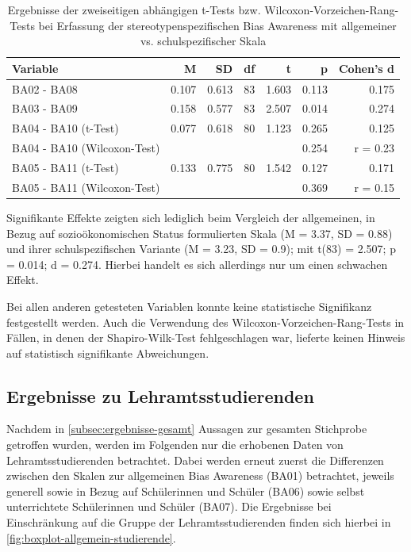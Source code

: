 \begin{table}[h!]
	\begin{tabularx}{\textwidth}{X | r | r | r | r | r | r}
		\hline
		Variable & M & SD & df & t & p & Cohen's d\\
		\hline
		BA02 - BA08 & 0.107 & 0.613 & 83 & 1.603 & 0.113 & 0.175\\
		BA03 - BA09 & 0.158 & 0.577 & 83 & 2.507 & 0.014 & 0.274\\
		BA04 - BA10 (t-Test) & 0.077 & 0.618 & 80 & 1.123 & 0.265 & 0.125\\
		BA04 - BA10 (Wilcoxon-Test) & & & & & 0.254 & r = 0.23\\
		BA05 - BA11 (t-Test) & 0.133 & 0.775 & 80 & 1.542 & 0.127 & 0.171\\
		BA05 - BA11 (Wilcoxon-Test) & & & & & 0.369 & r = 0.15\\
		\hline
	\end{tabularx}
	\caption{Ergebnisse der zweiseitigen abhängigen t-Tests bzw. Wilcoxon-Vorzeichen-Rang-Tests bei Erfassung der stereotypenspezifischen Bias Awareness mit allgemeiner vs. schulspezifischer Skala}
	\label{tab:t-tests-stereotypen-gesamt}
\end{table}

Signifikante Effekte zeigten sich lediglich beim Vergleich der allgemeinen, in Bezug auf sozioökonomischen Status formulierten Skala (M = 3.37, SD = 0.88) und ihrer schulspezifischen Variante (M = 3.23, SD = 0.9); mit t(83) = 2.507; p = 0.014; d = 0.274.
Hierbei handelt es sich allerdings nur um einen schwachen Effekt.

Bei allen anderen getesteten Variablen konnte keine statistische Signifikanz festgestellt werden.
Auch die Verwendung des Wilcoxon-Vorzeichen-Rang-Tests in Fällen, in denen der Shapiro-Wilk-Test fehlgeschlagen war, lieferte keinen Hinweis auf statistisch signifikante Abweichungen.

\subsection{Ergebnisse zu Lehramtsstudierenden}
\label{subsec:ergebnisse-studierende}

Nachdem in \autoref{subsec:ergebnisse-gesamt} Aussagen zur gesamten Stichprobe getroffen wurden, werden im Folgenden nur die erhobenen Daten von Lehramtsstudierenden betrachtet.
Dabei werden erneut zuerst die Differenzen zwischen den Skalen zur allgemeinen Bias Awareness (BA01) betrachtet, jeweils generell sowie in Bezug auf Schülerinnen und Schüler (BA06) sowie selbst unterrichtete Schülerinnen und Schüler (BA07).
Die Ergebnisse bei Einschränkung auf die Gruppe der Lehramtsstudierenden finden sich hierbei in \autoref{fig:boxplot-allgemein-studierende}.

